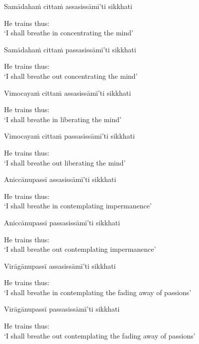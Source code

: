 Samādahaṁ cittaṁ assasissāmī'ti sikkhati

\begin{english}
  He trains thus:\\
  `I shall breathe in concentrating the mind'
\end{english}

Samādahaṁ cittaṁ passasissāmī'ti sikkhati

\begin{english}
  He trains thus:\\
  `I shall breathe out concentrating the mind'
\end{english}

Vimocayaṁ cittaṁ assasissāmī'ti sikkhati

\begin{english}
  He trains thus:\\
  `I shall breathe in liberating the mind'
\end{english}

Vimocayaṁ cittaṁ passasissāmī'ti sikkhati

\begin{english}
  He trains thus:\\
  `I shall breathe out liberating the mind'
\end{english}

Aniccānupassī assasissāmī'ti sikkhati

\begin{english}
  He trains thus:\\
  `I shall breathe in contemplating impermanence'
\end{english}

Aniccānupassī passasissāmī'ti sikkhati

\begin{english}
  He trains thus:\\
  `I shall breathe out contemplating impermanence'
\end{english}

Virāgānupassī assasissāmī'ti sikkhati

\begin{english}
  He trains thus:\\
  `I shall breathe in contemplating the fading away of passions'
\end{english}

Virāgānupassī passasissāmī'ti sikkhati

\begin{english}
  He trains thus:\\
  `I shall breathe out contemplating the fading away of passions'
\end{english}

